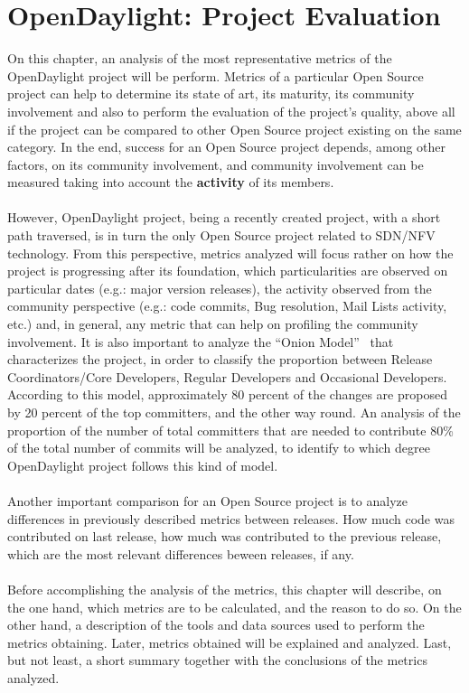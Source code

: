 \documentclass[a4paper, 12pt]{book}
\begin{document}
\chapter{OpenDaylight: Project Evaluation}
\label{chap:odlprojeval}
On this chapter, an analysis of the most representative metrics of the OpenDaylight project will be perform. Metrics of a particular Open Source project can help to determine its state of art, its maturity, its community involvement and also to perform the evaluation of the project's quality, above all if the project can be compared to other Open Source project existing on the same category. In the end, success for an Open Source project depends, among other factors, on its community involvement, and community involvement can be measured taking into account the \textbf{activity} of its members.\\
\\
However, OpenDaylight project, being a recently created project, with a short path traversed, is in turn the only Open Source project related to SDN/NFV technology. From this perspective, metrics analyzed will focus rather on how the project is progressing after its foundation, which particularities are observed on particular dates (e.g.: major version releases), the activity observed from the community perspective (e.g.: code commits, Bug resolution, Mail Lists activity, etc.) and, in general, any metric that can help on profiling the community involvement. It is also important to analyze the ``Onion Model''~\cite{OpenSourceSocialStructure} that characterizes the project, in order to classify the proportion between Release Coordinators/Core Developers, Regular Developers and Occasional Developers. According to this model, approximately 80 percent of the changes are proposed by 20 percent of the top committers, and the other way round. An analysis of the proportion of the number of total committers that are needed to contribute 80\% of the total number of commits will be analyzed, to identify to which degree OpenDaylight project follows this kind of model.\\
\\
Another important comparison for an Open Source project is to analyze differences in previously described metrics between releases. How much code was contributed on last release, how much was contributed to the previous release, which are the most relevant differences beween releases, if any.\\
\\
Before accomplishing the analysis of the metrics, this chapter will describe, on the one hand, which metrics are to be calculated, and the reason to do so. On the other hand, a description of the tools and data sources used to perform the metrics obtaining. Later, metrics obtained will be explained and analyzed. Last, but not least, a short summary together with the conclusions of the metrics analyzed.
\end{document}
